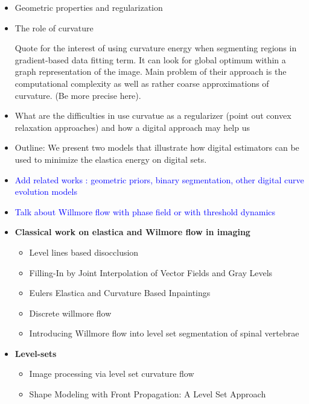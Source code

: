 \documentclass[runningheads]{llncs}
\newcommand{\todo}[1]{{\textcolor{blue}{#1}}}
\begin{document}
\begin{itemize}
\item{Geometric properties and regularization}
\item{The role of curvature} 
  
  Quote \cite{schoenemann2011elastic} for the interest of using curvature energy when segmenting regions in gradient-based data fitting term. It can look for global optimum within a graph representation of the image. Main problem of their approach is the computational complexity as well as rather coarse approximations of curvature. (Be more precise here).
  
\item{What are the difficulties in use curvatue as a regularizer (point out convex relaxation approaches) and how a digital approach may help us }
\item{Outline: We present two models that illustrate how digital estimators can be used to minimize the elastica energy on digital sets.  }
\item{\todo{Add related works : geometric priors, binary segmentation, other digital curve evolution models}}
\item{\todo{Talk about Willmore flow with phase field or with threshold dynamics}}
  
\item{\textbf{Classical work on elastica and Wilmore flow in imaging}}
  \begin{itemize}
  \item{Level lines based disocclusion \cite{masnou98inpainting} }	
  \item{Filling-In by Joint Interpolation of Vector Fields and Gray Levels \cite{ballester01filljoint} }
  \item{Eulers Elastica and Curvature Based Inpaintings \cite{chan02elasticainpainting} }
  \item{Discrete willmore flow \cite{bobenko2005discrete}}
  \item{Introducing Willmore flow into level set segmentation of spinal vertebrae \cite{lim2012introducing}}	
  \end{itemize}
  
\item{\textbf{Level-sets}}
  \begin{itemize}
  \item{Image processing via level set curvature flow \cite{malladi1995image} }
  \item{Shape Modeling with Front Propagation: A Level Set Approach \cite{malladi1995shape} }	
	\end{itemize}	
  

\end{itemize}
\end{document}
